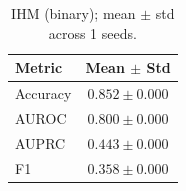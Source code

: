 \begin{table}[h]
\centering
\begin{tabular}{l|c}
\hline
Metric & Mean $\pm$ Std \\
\hline
Accuracy & $0.852 \pm 0.000$ \\
AUROC & $0.800 \pm 0.000$ \\
AUPRC & $0.443 \pm 0.000$ \\
F1 & $0.358 \pm 0.000$ \\
\hline
\end{tabular}
\caption{IHM (binary); mean $\pm$ std across 1 seeds.}
\end{table}
